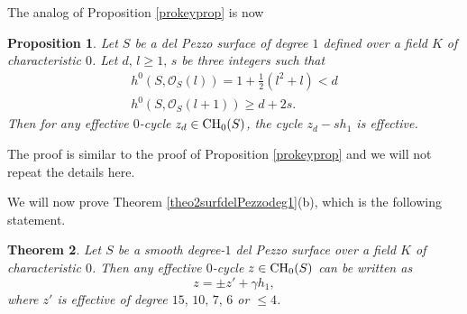 \documentclass[10pt]{article}
\newtheorem{theo}{Theorem}[section]
\newtheorem{prop}[theo]{Proposition}
\begin{document}
The analog of Proposition \ref{prokeyprop} is now
\begin{prop}\label{prokeypropdp1} Let $S$ be a del Pezzo surface of degree $1$ defined over a field $K$ of characteristic $0$. Let $d,\,l\geq 1,\,s$ be three integers such that
\begin{eqnarray}\label{eq1dp1} h^0(S,\mathcal{O}_S(l))=1+\frac{1}{2}(l^2+l) <d\\
\label{eq2dp2}  h^0(S,\mathcal{O}_S(l+1))\geq d+2s.
\end{eqnarray}
Then for any  effective $0$-cycle $z_d\in {\rm CH}_0(S)$, the cycle $z_d-sh_1$ is effective.
\end{prop}
 The proof is similar to the proof of  Proposition \ref{prokeyprop} and we will not repeat the details here.

We will now  prove
 Theorem \ref{theo2surfdelPezzodeg1}(b), which is the following statement.
\begin{theo} \label{theo2surfdelPezzodeg1variant}   Let   $S$ be a  smooth degree-$1$ del Pezzo surface over  a field $K$ of characteristic $0$. Then  any  effective $0$-cycle $z\in{\rm CH}_0(S)$ can be written as
$$ z=  \pm z'+\gamma h_1,
 $$
 where $z'$ is effective of degree $15,\,10,\,7,\,6$ or $\leq 4$.
\end{theo}
\end{document}
